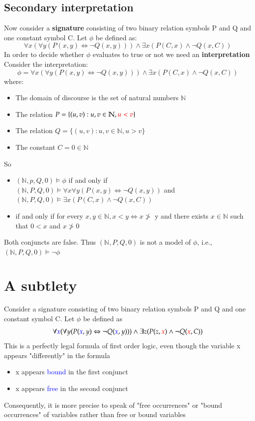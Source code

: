 \documentclass{article}[18pt]
\begin{document}
\subsection{Secondary interpretation}
Now consider a \textbf{signature} consisting of two binary relation symbols P and Q and one constant symbol C. Let $\phi$ be defined as:
$$\forall x ( \forall y ( P ( x , y ) \Leftrightarrow \neg Q ( x , y ) ) ) \wedge \exists x ( P ( C , x ) \wedge \neg Q ( x , C ) )$$
In order to decide whether $\phi$ evaluates to true or not we need an \textbf{interpretation}\\
Consider the interpretation:
$$\phi = \forall x ( \forall y ( P ( x , y ) \Leftrightarrow \neg Q ( x , y ) ) ) \wedge \exists x ( P ( C , x ) \wedge \neg Q ( x , C ) )$$
where:
\begin{itemize}
\item The domain of discourse is the set of natural numbers $\mathbb{N}$
\item The relation $P = \{ ( u , v ) : u , v \in \mathbb { N } , \textcolor{red}{u < v} \}$
\item The relation $Q = \{ ( u , v ) : u , v \in \mathbb { N } , u > v \}$
\item The constant $C=0\in \mathbb{ N }$
\end{itemize}
So
\begin{itemize}
\item $(\mathbb{ N },p,Q,0)\models \phi$ if and only if\\
$( \mathbb { N } , P , Q , 0 ) \models \forall x \forall y ( P ( x , y ) \Leftrightarrow \neg Q ( x , y ) )$ and $( \mathbb { N } , P , Q , 0 ) \models \exists x ( P ( C , x ) \wedge \neg Q ( x , C ) )$
\item if and only if for every $x,y \in \mathbb{ N }, x< y \Leftrightarrow x\ngtr$ y and there exists $x\in \mathbb{ N }$ such that $0< x$ and $x\ngtr 0$
\end{itemize}
Both conjuncts are false. Thus $(\mathbb{ N },P,Q,0)$ is not a model of $\phi$, i.e., $(\mathbb{ N },P,Q,0)\models \lnot\phi$
\section{A subtlety}
Consider a signature consisting of two binary relation symbols P and Q and one constant symbol C. Let $\phi$ be defined as
$$\forall \textcolor{blue}{x} ( \forall y ( P ( \textcolor{blue}{x} , y ) \Leftrightarrow \neg Q ( \textcolor{blue}{x} , y ) ) ) \wedge \exists z ( P ( z , \textcolor{red}{x} ) \wedge \neg Q ( \textcolor{red}{x} , C ) )$$
This is a perfectly legal formula of first order logic, even though the variable x appears "differently" in the formula
\begin{itemize}
\item x appears \textcolor{blue}{bound} in the first conjunct
\item x appears \textcolor{blue}{free} in the second conjunct
\end{itemize} 
Consequently, it is more precise to speak of "free occurrences" or "bound occurrences" of variables rather than free or bound variables
\end{document}
